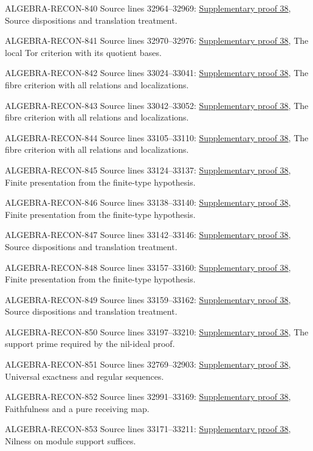 \begin{AlgebraSourceRoutes}
\item[ALGEBRA-RECON-840] Source lines 32964--32969: \hyperlink{algebra_more_flatness_notes_20260928}{Supplementary proof 38}, Source dispositions and translation treatment.
\item[ALGEBRA-RECON-841] Source lines 32970--32976: \hyperlink{algebra_more_flatness_notes_20260928}{Supplementary proof 38}, The local Tor criterion with its quotient bases.
\item[ALGEBRA-RECON-842] Source lines 33024--33041: \hyperlink{algebra_more_flatness_notes_20260928}{Supplementary proof 38}, The fibre criterion with all relations and localizations.
\item[ALGEBRA-RECON-843] Source lines 33042--33052: \hyperlink{algebra_more_flatness_notes_20260928}{Supplementary proof 38}, The fibre criterion with all relations and localizations.
\item[ALGEBRA-RECON-844] Source lines 33105--33110: \hyperlink{algebra_more_flatness_notes_20260928}{Supplementary proof 38}, The fibre criterion with all relations and localizations.
\item[ALGEBRA-RECON-845] Source lines 33124--33137: \hyperlink{algebra_more_flatness_notes_20260928}{Supplementary proof 38}, Finite presentation from the finite-type hypothesis.
\item[ALGEBRA-RECON-846] Source lines 33138--33140: \hyperlink{algebra_more_flatness_notes_20260928}{Supplementary proof 38}, Finite presentation from the finite-type hypothesis.
\item[ALGEBRA-RECON-847] Source lines 33142--33146: \hyperlink{algebra_more_flatness_notes_20260928}{Supplementary proof 38}, Source dispositions and translation treatment.
\item[ALGEBRA-RECON-848] Source lines 33157--33160: \hyperlink{algebra_more_flatness_notes_20260928}{Supplementary proof 38}, Finite presentation from the finite-type hypothesis.
\item[ALGEBRA-RECON-849] Source lines 33159--33162: \hyperlink{algebra_more_flatness_notes_20260928}{Supplementary proof 38}, Source dispositions and translation treatment.
\item[ALGEBRA-RECON-850] Source lines 33197--33210: \hyperlink{algebra_more_flatness_notes_20260928}{Supplementary proof 38}, The support prime required by the nil-ideal proof.
\item[ALGEBRA-RECON-851] Source lines 32769--32903: \hyperlink{algebra_more_flatness_notes_20260928}{Supplementary proof 38}, Universal exactness and regular sequences.
\item[ALGEBRA-RECON-852] Source lines 32991--33169: \hyperlink{algebra_more_flatness_notes_20260928}{Supplementary proof 38}, Faithfulness and a pure receiving map.
\item[ALGEBRA-RECON-853] Source lines 33171--33211: \hyperlink{algebra_more_flatness_notes_20260928}{Supplementary proof 38}, Nilness on module support suffices.
\end{AlgebraSourceRoutes}

